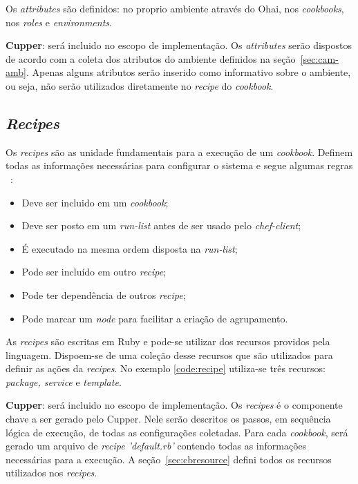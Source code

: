 Os \textit{attributes} são definidos: no proprio ambiente através do Ohai, nos \textit{cookbooks},
nos \textit{roles} e \textit{environments}.

\textbf{Cupper}: será incluido no escopo de implementação. Os \textit{attributes} serão dispostos
de acordo com a coleta dos atributos do ambiente definidos na seção~\ref{sec:cam-amb}.
Apenas alguns atributos serão inserido como informativo sobre o ambiente, ou seja,
não serão utilizados diretamente no \textit{recipe} do \textit{cookbook}.

\subsection{\textit{Recipes}}
\label{sec:lev-rec-rec}

Os \textit{recipes} são as unidade fundamentais para a execução de um \textit{cookbook}. Definem
todas as informações necessárias para configurar o sistema e segue algumas regras
~\cite{chefdoc:2016}:

\begin{itemize}
  \item Deve ser incluido em um \textit{cookbook};
  \item Deve ser posto em um \textit{run-list} antes de ser usado pelo \textit{chef-client};
  \item É executado na mesma ordem disposta na \textit{run-list};
  \item Pode ser incluído em outro \textit{recipe};
  \item Pode ter dependência de outros \textit{recipe};
  \item Pode marcar um \textit{node} para facilitar a criação de agrupamento.
\end{itemize}

As \textit{recipes} são escritas em Ruby e pode-se utilizar dos recursos providos
pela linguagem. Dispoem-se de uma coleção desse recursos que são utilizados
para definir as ações da \textit{recipes}. No exemplo \ref{code:recipe} utiliza-se
três recursos: \textit{package, service} e \textit{template}.

\begin{minipage}{.90\textwidth}
  \lstset{style=shell}
  
\end{minipage}

\textbf{Cupper}: será incluido no escopo de implementação. Os \textit{recipes} é o componente chave a
ser gerado pelo Cupper. Nele serão descritos os passos, em sequência lógica de execução,
de todas as configurações coletadas. Para cada \textit{cookbook}, será gerado um arquivo de 
\textit{recipe 'default.rb'} contendo todas as informações necessárias para a execução.
A seção~\ref{sec:cbresource} defini todos os recursos utilizados nos \textit{recipes}.

